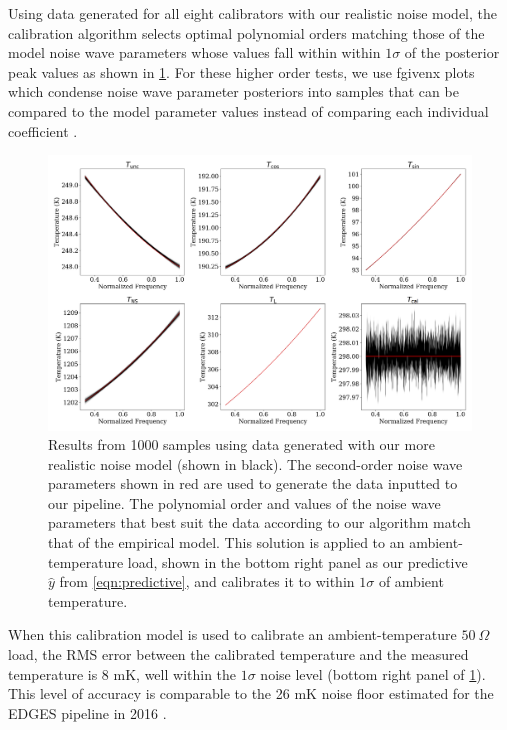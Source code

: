 Using data generated for all eight calibrators with our realistic noise model, the calibration algorithm selects optimal polynomial orders matching those of the model noise wave parameters whose values fall within within $1\sigma$ of the posterior peak values as shown in \cref{fig:fgxSamples}. For these higher order tests, we use fgivenx plots which condense noise wave parameter posteriors into samples that can be compared to the model parameter values instead of comparing each individual coefficient \citep{fgx}.
\begin{figure}
    \centering
    \includegraphics[width=\textwidth]{fgxSamples}
    \caption{Results from 1000 samples using data generated with our more realistic noise model (shown in black). The second-order noise wave parameters shown in red are used to generate the data inputted to our pipeline. The polynomial order and values of the noise wave parameters that best suit the data according to our algorithm match that of the empirical model. This solution is applied to an ambient-temperature load, shown in the bottom right panel as our predictive $\hat{y}$ from \cref{eqn:predictive}, and calibrates it to within $1\sigma$ of ambient temperature. \label{fig:fgxSamples}}
\end{figure}

When this calibration model is used to calibrate an ambient-temperature $50 \ \Omega$ load, the RMS error between the calibrated temperature and the measured temperature is 8 mK, well within the $1\sigma$ noise level (bottom right panel of \cref{fig:fgxSamples}). This level of accuracy is comparable to the 26 mK noise floor estimated for the EDGES pipeline in 2016 \citep{edgesCal}.


